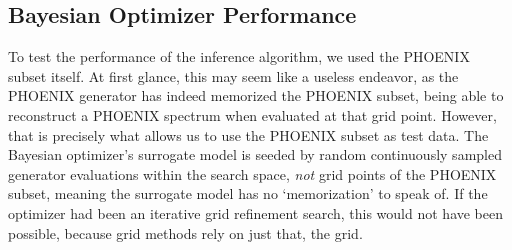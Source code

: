 \documentclass[twocolumn]{aastex631}
\begin{document}
\subsection{Bayesian Optimizer Performance}
To test the performance of the inference algorithm, we used the PHOENIX subset
itself. At first glance, this may seem like a useless endeavor, as the 
PHOENIX generator has indeed memorized the PHOENIX subset, being able to
reconstruct a PHOENIX spectrum when evaluated at that grid point. However,
that is precisely what allows us to use the PHOENIX subset as test data.
The Bayesian optimizer's surrogate model is seeded by random continuously 
sampled generator evaluations within the search space, \textit{not} grid 
points of the PHOENIX subset, meaning the surrogate model has no `memorization' 
to speak of. If the optimizer had been an iterative grid refinement search, 
this would not have been possible, because grid methods rely on just that, 
the grid.
\end{document}
